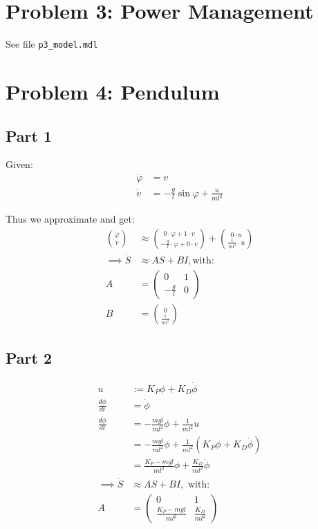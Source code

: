\documentclass[a4paper,parskip,headheight=38pt]{scrartcl} %
\begin{document}
 \pagebreak{}
\section*{Problem 3: Power Management}

See file \texttt{p3\_model.mdl}


\section*{Problem 4: Pendulum}

\subsection*{Part 1}

Given:
\begin{align*}
    \dot{\varphi} &= v \\
    \dot{v} &= - \frac{g}{l} \sin \varphi + \frac{u}{ml^2}
\end{align*}

Thus we approximate and get:
\begin{align*}
    \binom{\dot{\varphi}}{\dot{v}} &\approx \binom{0 \cdot \varphi + 1 \cdot v}{- \frac{g}{l} \cdot \varphi + 0 \cdot v} + \binom{0 \cdot u}{\frac{1}{ml^2} \cdot u} \\
    \implies \dot{S} &\approx AS + BI, \text{with:} \\
    A &= \left( \begin{array}{cc} 0 & 1 \\ -\frac{g}{l} & 0 \end{array} \right) \\
    B &= \binom{0}{\frac{1}{ml^2}}
\end{align*}

\subsection*{Part 2}
\begin{align*}
	u &:= K_P \phi + K_D \dot{\phi} \\
	\frac{d \phi}{d t} &= \dot{\phi} \\
	\frac{d \dot{\phi}}{d t} &= - \frac{mgl}{ml^2} \phi + \frac{1}{ml^2}u \\
	&= - \frac{mgl}{ml^2} \phi + \frac{1}{ml^2} (K_P \phi + K_D \dot{\phi}) \\
	&= \frac{K_P-mgl}{ml^2}\phi + \frac{K_D}{ml^2}\dot{\phi} \\
	\implies \dot{S} &\approx AS + BI, \text{ with:} \\
    A &= \left( \begin{array}{cc} 0 & 1 \\ \frac{K_P-mgl}{ml^2} & \frac{K_D}{ml^2} \end{array} \right)
\end{align*}
\end{document}
